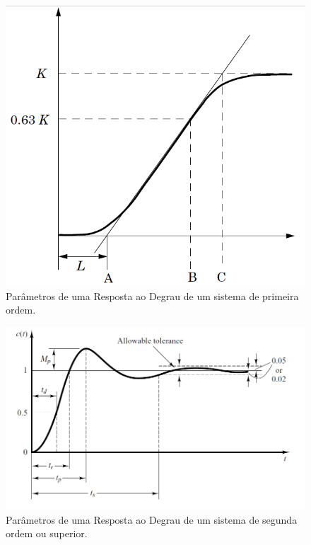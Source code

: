 \begin{figure}[htb]
  \caption{Parâmetros de uma Resposta ao Degrau de um sistema de primeira ordem.}
  \begin{center}
      \includegraphics[scale=0.5]{img/transient_astrom_p17}
  \end{center}
  \label{fig:transient_astrom_p17}
\end{figure}

\begin{figure}[htb]
  \caption{Parâmetros de uma Resposta ao Degrau de um sistema de segunda ordem ou superior.}
  \begin{center}
      \includegraphics[scale=0.5]{img/transient_ogata_p170}
  \end{center}
  \label{fig:transient_ogata_p170}
\end{figure}

